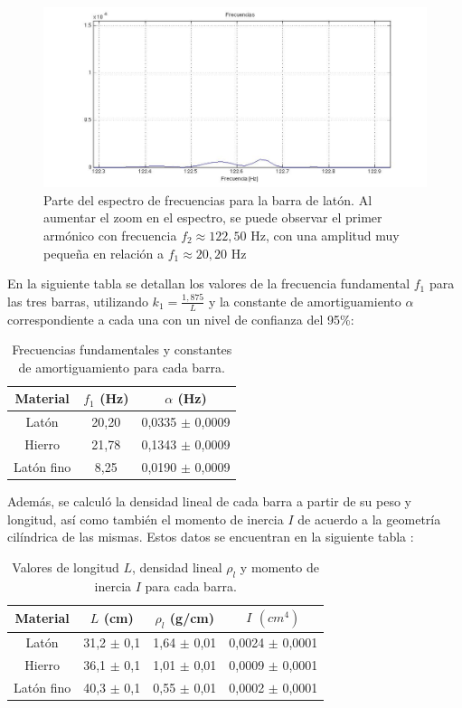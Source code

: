 \documentclass[twoside,twocolumn,a4paper]{article}
\begin{document}
\begin{figure}[H]
\includegraphics[width=\linewidth]{espectrolatonarmonico.jpg}
\caption{Parte del espectro de frecuencias para la barra de lat\'on. Al aumentar el zoom en el espectro, se puede observar el primer arm\'onico con frecuencia $f_{2} \approx 122,50$ Hz, con una amplitud muy peque\~na en relaci\'on a $f_{1} \approx 20,20$ Hz}
\label{fig:espectrolatonarmonico}
\end{figure}


En la siguiente tabla se detallan los valores de la frecuencia fundamental $f_{1}$ para las tres barras, utilizando $k_{1} = \frac{1,875}{L}$ y la constante de amortiguamiento $\alpha$ correspondiente a cada una con un nivel de confianza del 95\%:


\begin{table}[H]
\centering
\caption{Frecuencias fundamentales y constantes de amortiguamiento para cada barra.}
\label{tab:fya_barras}
\begin{tabular}{|c|c|c|}
\hline
Material & $f_{1}$ (Hz) & $\alpha$ (Hz) \\ \hline
Lat\'on & 20,20 & 0,0335 $\pm$ 0,0009\\ \hline
Hierro & 21,78 & 0,1343 $\pm$ 0,0009  \\ \hline
Lat\'on fino & 8,25 & 0,0190 $\pm$ 0,0009\\ \hline
\end{tabular}
\end{table}


Adem\'as, se calcul\'o la densidad lineal de cada barra a partir de su peso y longitud, as\'i como tambi\'en el momento de inercia $I$ de acuerdo a la geometr\'ia cil\'indrica de las mismas. Estos datos se encuentran en la siguiente tabla :

\begin{table}[H]
\centering
\caption{Valores de longitud $L$, densidad lineal $\rho_{l}$ y momento de inercia $I$ para cada barra.}
\label{tab:params_barras}
\begin{tabular}{|c|c|c|c|}
\hline
Material & $L$ (cm) & $\rho_{l}$ (g/cm) & $I$ $(cm^{4})$\\ \hline
Lat\'on & 31,2 $\pm$ 0,1 & 1,64 $\pm$ 0,01 & 0,0024 $\pm$ 0,0001\\ \hline
Hierro & 36,1 $\pm$ 0,1 & 1,01 $\pm$ 0,01 & 0,0009 $\pm$ 0,0001\\ \hline
Lat\'on fino & 40,3 $\pm$ 0,1 & 0,55 $\pm$ 0,01 & 0,0002 $\pm$ 0,0001\\ \hline
\end{tabular}
\end{table}
\end{document}
